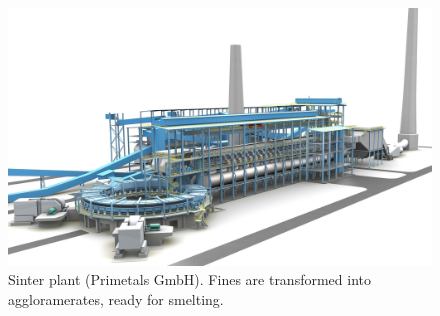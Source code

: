 \begin{figure}[!htb]
\centering
\includegraphics[width=.86\columnwidth]{images/124sinterplant}
\caption[Sinter plant]{Sinter plant (Primetals GmbH). Fines are transformed
into aggloramerates, ready for smelting.}
\label{fig:124sinterplant}
\end{figure}